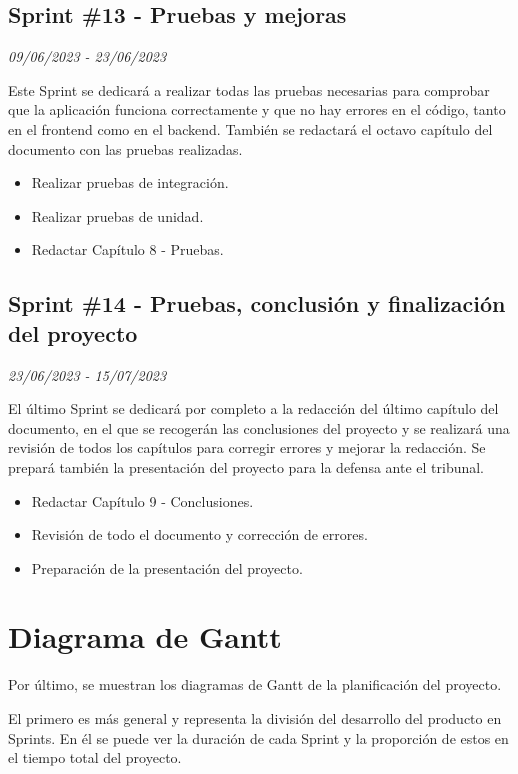 \subsection{Sprint \#13 - Pruebas y mejoras}
\textit{09/06/2023   -   23/06/2023}

Este Sprint se dedicará a realizar todas las pruebas necesarias para comprobar que la aplicación funciona correctamente y que no hay errores en el código, tanto
en el frontend como en el backend. También se redactará el octavo capítulo del documento con las pruebas realizadas.

\begin{itemize}
    \item Realizar pruebas de integración.
    \item Realizar pruebas de unidad.
    \item Redactar Capítulo 8 - Pruebas.
\end{itemize}

\subsection{Sprint \#14 - Pruebas, conclusión y finalización del proyecto}
\textit{23/06/2023   -   15/07/2023}

El último Sprint se dedicará por completo a la redacción del último capítulo del documento, en el que se recogerán las conclusiones del proyecto y se realizará una revisión
de todos los capítulos para corregir errores y mejorar la redacción. Se prepará también la presentación del proyecto para la defensa ante el tribunal.
\begin{itemize}
    \item Redactar Capítulo 9 - Conclusiones.
    \item Revisión de todo el documento y corrección de errores.
    \item Preparación de la presentación del proyecto.
\end{itemize}


\newpage

\section{Diagrama de Gantt}
Por último, se muestran los diagramas de Gantt de la planificación del proyecto. 


El primero es más general y representa la división del desarrollo del producto en Sprints.
En él se puede ver la duración de cada Sprint y la proporción de estos en el tiempo total del proyecto. 

